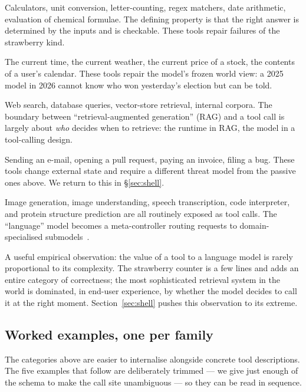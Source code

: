 \begin{description}[style=nextline,leftmargin=1.5em]
\item[Closed-form computation.] Calculators, unit conversion,
  letter-counting, regex matchers, date arithmetic, evaluation of
  chemical formulae. The defining property is that the right answer
  is determined by the inputs and is checkable. These tools repair
  failures of the strawberry kind.
\item[Real-world state.] The current time, the current weather, the
  current price of a stock, the contents of a user's calendar. These
  tools repair the model's frozen world view: a 2025 model in 2026
  cannot know who won yesterday's election but can be told.
\item[Information retrieval.] Web search, database queries,
  vector-store retrieval, internal corpora. The boundary between
  ``retrieval-augmented generation'' (RAG) and a tool call is
  largely about \emph{who} decides when to retrieve: the runtime in
  RAG, the model in a tool-calling design.
\item[Action in external systems.] Sending an e-mail, opening a pull
  request, paying an invoice, filing a bug. These tools change
  external state and require a different threat model from the
  passive ones above. We return to this in \S\ref{sec:shell}.
\item[Specialised models.] Image generation, image understanding,
  speech transcription, code interpreter, and protein structure
  prediction are all routinely exposed as tool calls. The
  ``language'' model becomes a meta-controller routing requests to
  domain-specialised submodels~\citep{patil2023gorilla}.
\end{description}

\noindent
A useful empirical observation: the value of a tool to a language
model is rarely proportional to its complexity. The strawberry
counter is a few lines and adds an entire category of correctness;
the most sophisticated retrieval system in the world is dominated, in
end-user experience, by whether the model decides to call it at the
right moment. Section~\ref{sec:shell} pushes this observation to its
extreme.

\subsection{Worked examples, one per family}
\label{sec:taxonomy-examples}

The categories above are easier to internalise alongside concrete
tool descriptions. The five examples that follow are deliberately
trimmed --- we give just enough of the schema to make the call site
unambiguous --- so they can be read in sequence.

